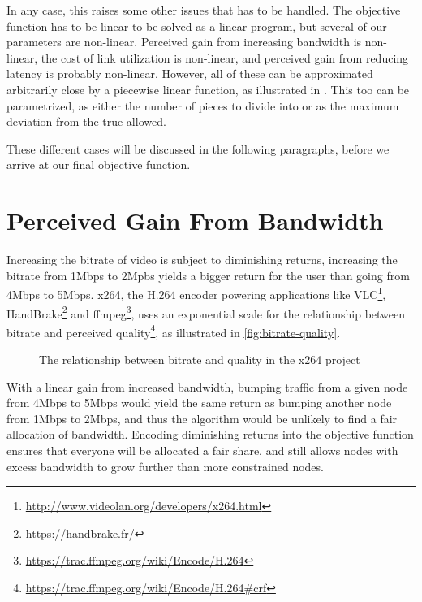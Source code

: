 In any case, this raises some other issues that has to be handled. The objective function has to be linear to be solved as a linear program, but several of our parameters are non-linear. Perceived gain from increasing bandwidth is non-linear, the cost of link utilization is non-linear, and perceived gain from reducing latency is probably non-linear. However, all of these can be approximated arbitrarily close by a piecewise linear function, as illustrated in . This too can be parametrized, as either the number of pieces to divide into or as the maximum deviation from the true allowed.

These different cases will be discussed in the following paragraphs, before we arrive at our final objective function.


\section{Perceived Gain From Bandwidth}

Increasing the bitrate of video is subject to diminishing returns, increasing the bitrate from 1Mbps to 2Mpbs yields a bigger return for the user than going from 4Mbps to 5Mbps. x264, the H.264 encoder powering applications like VLC\footnote{\url{http://www.videolan.org/developers/x264.html}}, HandBrake\footnote{\url{https://handbrake.fr/}} and ffmpeg\footnote{\url{https://trac.ffmpeg.org/wiki/Encode/H.264}}, uses an exponential scale for the relationship between bitrate and perceived quality\footnote{\url{https://trac.ffmpeg.org/wiki/Encode/H.264\#crf}}, as illustrated in \autoref{fig:bitrate-quality}.

\begin{figure}
    \centering


    \caption{The relationship between bitrate and quality in the x264 project}
    \label{fig:bitrate-quality}
\end{figure}

With a linear gain from increased bandwidth, bumping traffic from a given node from 4Mbps to 5Mbps would yield the same return as bumping another node from 1Mbps to 2Mbps, and thus the algorithm would be unlikely to find a fair allocation of bandwidth. Encoding diminishing returns into the objective function ensures that everyone will be allocated a fair share, and still allows nodes with excess bandwidth to grow further than more constrained nodes.

